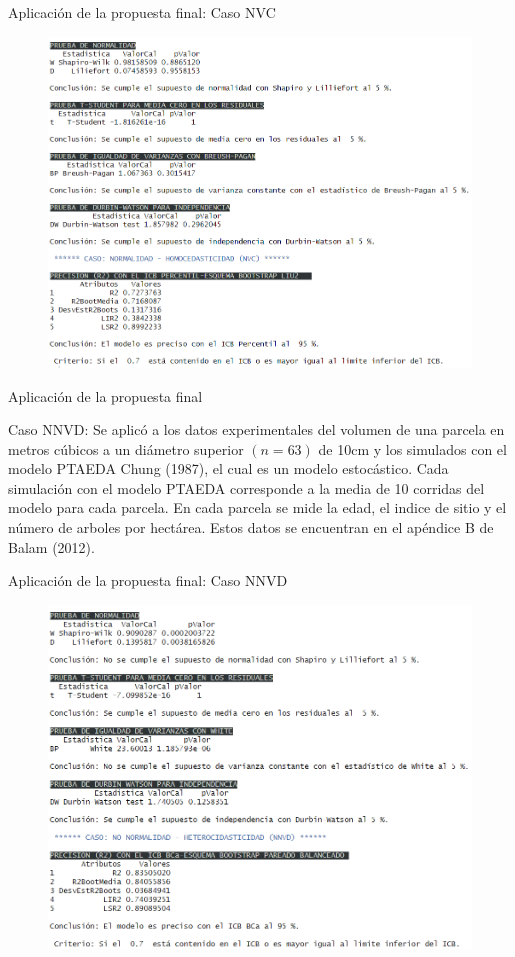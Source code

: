 \documentclass[serif, aspectratio=169]{beamer}
\begin{document}
\begin{frame}{Aplicación de la propuesta final: Caso NVC}
	\begin{figure}[ht!]
		\centering 
		\includegraphics[width=0.65\linewidth]{recurso/Uso_NVC_PropuestaFinal.png} 
		\label{fig:final_NVC_resultados}
	\end{figure}
\end{frame}



\begin{frame}{Aplicación de la propuesta final}
	\begin{exampleblock}{Caso NNVD:}
		Se aplicó a los datos experimentales del volumen de una parcela en metros cúbicos a un diámetro superior $(n = 63)$ de 10cm y los simulados con el modelo PTAEDA Chung (1987), el cual es un modelo estocástico. Cada simulación con el modelo PTAEDA corresponde a la media de 10 corridas del modelo para cada parcela. En cada parcela se mide la edad, el indice de sitio y el número de arboles por hectárea. Estos datos se encuentran en el apéndice B de Balam (2012).
	\end{exampleblock}
\end{frame}


\begin{frame}{Aplicación de la propuesta final: Caso NNVD}
	\begin{figure}[ht!]
		\centering 
		\includegraphics[width=0.62\linewidth]{recurso/Uso_NNVD_PropuestaFinal.png} 
		\label{fig:final_NNVD_resultados}
	\end{figure}
\end{frame}
\end{document}

